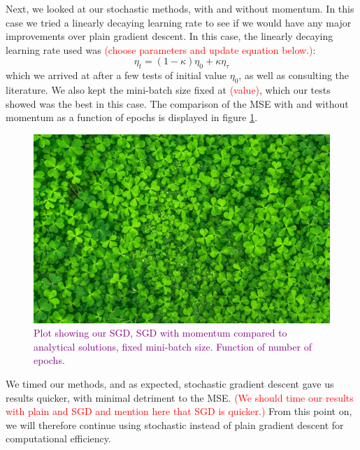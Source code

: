 Next, we looked at our stochastic methods, with and without momentum. In this case we tried a linearly decaying learning rate to see if we would have any major improvements over plain gradient descent. In this case, the linearly decaying learning rate used was \textcolor{red}{(choose parameters and update equation below.)}:
\[
\eta_t = (1- \kappa)\eta_0 + \kappa \eta_\tau 
\]
which we arrived at after a few tests of initial value $\eta_0$, as well as consulting the literature. We also kept the mini-batch size fixed at \textcolor{red}{(value)}, which our tests showed was the best in this case. The comparison of the MSE with and without momentum as a function of epochs is displayed in figure \ref{fig:sgdVSanalytical}.
\begin{figure}
    \centering
    \includegraphics[width=0.5\linewidth]{figures/placeholders/sgdVSanalytical.png}
    \caption{\textcolor{purple}{Plot showing our SGD, SGD with momentum  compared to analytical solutions, fixed mini-batch size. Function of number of epochs.}}
    \label{fig:sgdVSanalytical}
\end{figure}

We timed our methods, and as expected, stochastic gradient descent gave us results quicker, with minimal detriment to the MSE. \textcolor{red}{(We should time our results with plain and SGD and mention here that SGD is quicker.)} From this point on, we will therefore continue using stochastic instead of plain gradient descent for computational efficiency.

